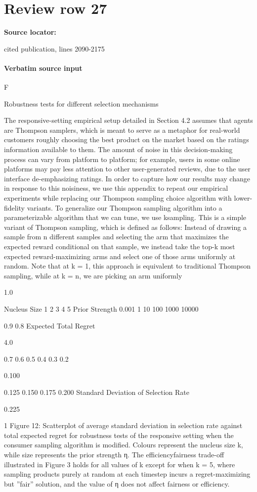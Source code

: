 \documentclass[10pt]{article}
\begin{document}
\section*{Review row 27}
\textbf{Source locator:} {\footnotesize\raggedright cited publication, lines 2090-\allowbreak{}2175\par}
\paragraph{Verbatim source input}
\begin{ReviewVerbatim}
F

Robustness tests for different selection
mechanisms

The responsive-setting empirical setup detailed in Section
4.2 assumes that agents are Thompson samplers, which
is meant to serve as a metaphor for real-world customers
roughly choosing the best product on the market based on
the ratings information available to them. The amount of
noise in this decision-making process can vary from platform to platform; for example, users in some online platforms may pay less attention to other user-generated reviews, due to the user interface de-emphasizing ratings. In
order to capture how our results may change in response to
this noisiness, we use this appendix to repeat our empirical
experiments while replacing our Thompson sampling choice
algorithm with lower-fidelity variants.
To generalize our Thompson sampling algorithm into
a parameterizable algorithm that we can tune, we use ksampling. This is a simple variant of Thompson sampling,
which is defined as follows: Instead of drawing a sample
from n different samples and selecting the arm that maximizes the expected reward conditional on that sample, we instead take the top-k most expected reward-maximizing arms
and select one of those arms uniformly at random. Note that
at k = 1, this approach is equivalent to traditional Thompson
sampling, while at k = n, we are picking an arm uniformly

1.0

Nucleus Size
1
2
3
4
5
Prior Strength
0.001
1
10
100
1000
10000

0.9
0.8
Expected Total Regret

4.0

0.7
0.6
0.5
0.4
0.3
0.2

0.100

0.125
0.150
0.175
0.200
Standard Deviation of Selection Rate

0.225

1
Figure 12: Scatterplot of average
standard deviation in selection rate against total expected regret for robustness tests
of the responsive setting when the consumer sampling algorithm is modified. Colours represent the nucleus size k,
while size represents the prior strength η. The efficiencyfairness trade-off illustrated in Figure 3 holds for all values
of k except for when k = 5, where sampling products purely
at random at each timestep incurs a regret-maximizing but
”fair” solution, and the value of η does not affect fairness or
efficiency.


\end{ReviewVerbatim}
\end{document}
